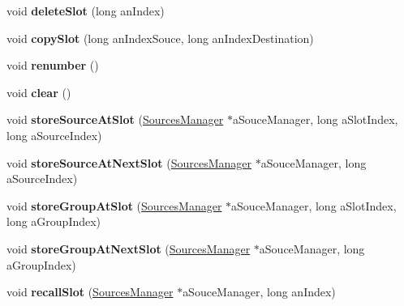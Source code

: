 \begin{DoxyCompactItemize}
\item 
\hypertarget{class_sources_preset_a2fb3965fe3d7ae3fe3d20d7fd789888f}{void {\bfseries delete\-Slot} (long an\-Index)}\label{class_sources_preset_a2fb3965fe3d7ae3fe3d20d7fd789888f}

\item 
\hypertarget{class_sources_preset_a80a62c575519b01e97183d869f52ff20}{void {\bfseries copy\-Slot} (long an\-Index\-Souce, long an\-Index\-Destination)}\label{class_sources_preset_a80a62c575519b01e97183d869f52ff20}

\item 
\hypertarget{class_sources_preset_a8259bcfaa2335eaef6ee273cac13fc05}{void {\bfseries renumber} ()}\label{class_sources_preset_a8259bcfaa2335eaef6ee273cac13fc05}

\item 
\hypertarget{class_sources_preset_a2687dc610e8a02d470d7e2e33516c010}{void {\bfseries clear} ()}\label{class_sources_preset_a2687dc610e8a02d470d7e2e33516c010}

\item 
\hypertarget{class_sources_preset_ab8fde193ed4c08e1f479305eda3cbc3a}{void {\bfseries store\-Source\-At\-Slot} (\hyperlink{class_sources_manager}{Sources\-Manager} $\ast$a\-Souce\-Manager, long a\-Slot\-Index, long a\-Source\-Index)}\label{class_sources_preset_ab8fde193ed4c08e1f479305eda3cbc3a}

\item 
\hypertarget{class_sources_preset_a83cc05d8d40b3f46d228dbca92b858da}{void {\bfseries store\-Source\-At\-Next\-Slot} (\hyperlink{class_sources_manager}{Sources\-Manager} $\ast$a\-Souce\-Manager, long a\-Source\-Index)}\label{class_sources_preset_a83cc05d8d40b3f46d228dbca92b858da}

\item 
\hypertarget{class_sources_preset_aff296426704730c4a166223ed3e1b0b0}{void {\bfseries store\-Group\-At\-Slot} (\hyperlink{class_sources_manager}{Sources\-Manager} $\ast$a\-Souce\-Manager, long a\-Slot\-Index, long a\-Group\-Index)}\label{class_sources_preset_aff296426704730c4a166223ed3e1b0b0}

\item 
\hypertarget{class_sources_preset_a41911df7af802088a3d9c8889dd4d722}{void {\bfseries store\-Group\-At\-Next\-Slot} (\hyperlink{class_sources_manager}{Sources\-Manager} $\ast$a\-Souce\-Manager, long a\-Group\-Index)}\label{class_sources_preset_a41911df7af802088a3d9c8889dd4d722}

\item 
\hypertarget{class_sources_preset_a7448d5812c15aed92039077ef47b4845}{void {\bfseries recall\-Slot} (\hyperlink{class_sources_manager}{Sources\-Manager} $\ast$a\-Souce\-Manager, long an\-Index)}\label{class_sources_preset_a7448d5812c15aed92039077ef47b4845}


\end{DoxyCompactItemize}
